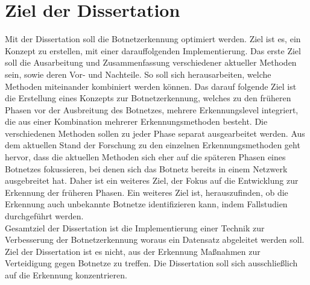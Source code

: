 \section{Ziel der Dissertation}
\label{sec:goals}

Mit der Dissertation soll die Botnetzerkennung optimiert werden. Ziel ist es, ein Konzept zu erstellen, mit einer darauffolgenden Implementierung. Das erste Ziel soll
die Ausarbeitung und Zusammenfassung verschiedener aktueller Methoden sein, sowie deren Vor- und Nachteile. So soll sich herausarbeiten, welche Methoden miteinander
kombiniert werden können. Das darauf folgende Ziel ist die Erstellung eines Konzepts zur Botnetzerkennung, welches zu den früheren Phasen vor der Ausbreitung des 
Botnetzes, mehrere Erkennungslevel integriert, die aus einer Kombination mehrerer Erkennungsmethoden besteht. Die verschiedenen Methoden sollen zu jeder Phase separat
ausgearbeitet werden. Aus dem aktuellen Stand der Forschung zu den einzelnen Erkennungsmethoden geht hervor, 
dass die aktuellen Methoden sich eher auf die späteren Phasen eines Botnetzes fokussieren, bei denen sich das Botnetz bereits in einem Netzwerk ausgebreitet hat.
Daher ist ein weiteres Ziel, der Fokus auf die Entwicklung zur Erkennung der früheren Phasen. Ein weiteres Ziel ist, herauszufinden, ob die Erkennung auch unbekannte Botnetze 
identifizieren kann, indem Fallstudien durchgeführt werden. \\ Gesamtziel der Dissertation ist die Implementierung einer Technik zur Verbesserung der Botnetzerkennung woraus
ein Datensatz abgeleitet werden soll. Ziel der Dissertation ist es nicht, aus der Erkennung Maßnahmen zur Verteidigung gegen Botnetze zu treffen. Die Dissertation soll sich 
ausschließlich auf die Erkennung konzentrieren.
